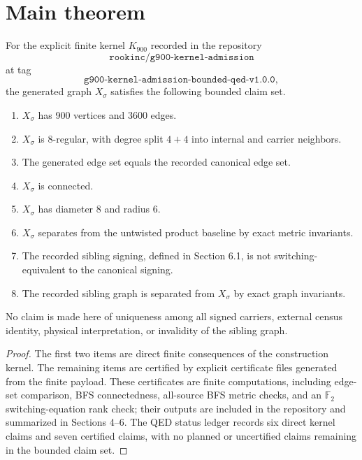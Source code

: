 \section{Main theorem}

\begin{theorem}
For the explicit finite kernel \(K_{900}\) recorded in the repository
\[
\texttt{rookinc/g900-kernel-admission}
\]
at tag
\[
\texttt{g900-kernel-admission-bounded-qed-v1.0.0},
\]
the generated graph \(X_\sigma\) satisfies the following bounded claim set.

\begin{enumerate}[leftmargin=2em]
\item \(X_\sigma\) has 900 vertices and 3600 edges.
\item \(X_\sigma\) is 8-regular, with degree split \(4+4\) into internal and carrier neighbors.
\item The generated edge set equals the recorded canonical edge set.
\item \(X_\sigma\) is connected.
\item \(X_\sigma\) has diameter 8 and radius 6.
\item \(X_\sigma\) separates from the untwisted product baseline by exact metric invariants.
\item The recorded sibling signing, defined in Section 6.1, is not switching-equivalent to the canonical signing.
\item The recorded sibling graph is separated from \(X_\sigma\) by exact graph invariants.
\end{enumerate}

No claim is made here of uniqueness among all signed carriers, external census identity, physical interpretation, or invalidity of the sibling graph.
\end{theorem}

\begin{proof}
The first two items are direct finite consequences of the construction kernel. The remaining items are certified by explicit certificate files generated from the finite payload. These certificates are finite computations, including edge-set comparison, BFS connectedness, all-source BFS metric checks, and an \(\mathbb F_2\) switching-equation rank check; their outputs are included in the repository and summarized in Sections 4--6. The QED status ledger records six direct kernel claims and seven certified claims, with no planned or uncertified claims remaining in the bounded claim set.
\end{proof}

